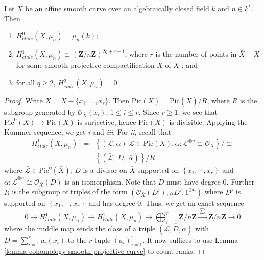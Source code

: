 \begin{lemma}
\label{lemma-vanishing-cohomology-mu-smooth-curve}
Let $X$ be an affine smooth curve over an algebraically closed field $k$ and
$n\in k^*$. Then
\begin{enumerate}
\item
$H_{\acute{e}tale}^0(X, \mu_n) = \mu_n(k)$;
\item
$H_{\acute{e}tale}^1(X, \mu_n) \cong
\left(\mathbf{Z}/n\mathbf{Z}\right)^{2g+r-1}$, where
$r$ is the number of points in $\bar X - X$ for some smooth projective
compactification $\bar X$ of $X$ ; and
\item
for all $q\geq 2$, $H_{\acute{e}tale}^q(X, \mu_n) = 0$.
\end{enumerate}
\end{lemma}

\begin{proof}
Write $X = \bar X - \{ x_1, \dots, x_r\}$. Then $\text{Pic}(X) =
\text{Pic}(\bar X)/ R$, where $R$ is the subgroup generated by
$\mathcal{O}_{\bar X}(x_i)$, $1 \leq i \leq r$. Since $r \geq 1$, we see that
$\text{Pic}^0(X) \to \text{Pic}(X)$ is surjective, hence $\text{Pic}(X)$ is
divisible. Applying the Kummer sequence, we get {\it i} and {\it iii}. For {\it
ii}, recall that
\begin{eqnarray*}
H_{\acute{e}tale}^1(X, \mu_n) & = &
\left\{
(\mathcal L, \alpha) | \mathcal L \in \text{Pic}(X),
\alpha: \mathcal{L}^{\otimes n} \cong \mathcal{O}_X
\right\}
{\bigg /} {\cong} \\
& = &
\left\{(\bar{\mathcal L}, \ D, \ \bar \alpha) \right\} {\big /} \tilde{R}
\end{eqnarray*}
where $\bar{\mathcal L} \in \text{Pic}^0(\bar X)$, $D$ is a divisor on $\bar X$
supported on $\left\{x_1, \cdots, x_r\right\}$ and $ \bar{\alpha}:
\bar{\mathcal L}^{\otimes n} \cong \mathcal{O}_{\bar{X}}(D)$ is an isomorphism.
Note that $D$ must have degree 0. Further $\tilde{R}$ is the subgroup of
triples of the form $(\mathcal{O}_{\bar X}(D'), n D', 1^{\otimes n})$ where
$D'$ is supported on $\left\{x_1, \cdots, x_r\right\}$ and has degree 0. Thus,
we get an exact sequence
$$
0 \longrightarrow
H_{\acute{e}tale}^1(\bar X, \mu_n) \longrightarrow
H_{\acute{e}tale}^1(X, \mu_n) \longrightarrow
\bigoplus_{i=1}^r \mathbf{Z}/n\mathbf{Z}
\xrightarrow{\ \sum\ }
\mathbf{Z}/n\mathbf{Z} \longrightarrow 0
$$
where the middle map sends the class of a triple $(\bar{ \mathcal L}, D, \bar
\alpha)$ with $D = \sum_{i=1}^r a_i (x_i)$ to the $r$-tuple $(a_i)_{i=1}^r$. It
now suffices to use
Lemma \ref{lemma-cohomology-smooth-projective-curve}
to count ranks.
\end{proof}

